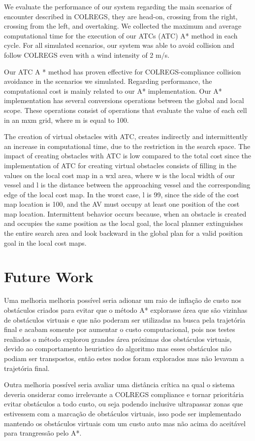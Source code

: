     We evaluate the performance of our system regarding the main scenarios of encounter described in \ac{COLREGS}, they are head-on, crossing from the right, crossing from the left, and overtaking. We collected the maximum and average computational time for the execution of our \aclp{ATC} (\ac{ATC}) A* method in each cycle. For all simulated scenarios, our system was able to avoid collision and follow \ac{COLREGS} even with a wind intensity of 2 m/s.

    Our \ac{ATC} A * method has proven effective for \ac{COLREGS}-compliance collision avoidance in the scenarios we simulated. Regarding performance, the computational cost is mainly related to our A* implementation. Our A* implementation has several conversions operations between the global and local scope. These operations consist of operations that evaluate the value of each cell in an mxm grid, where m is equal to 100.
    
    The creation of virtual obstacles with \ac{ATC}, creates indirectly and intermittently an increase in computational time, due to the restriction in the search space. The impact of creating obstacles with \ac{ATC} is low compared to the total cost since the implementation of \ac{ATC} for creating virtual obstacles consists of filling in the values on the local cost map in a wxl area, where w is the local width of our vessel and l  is the distance between the approaching vessel and the corresponding edge of the local cost map. In the worst case, l is 99, since the side of the cost map location is 100, and the \ac{AV} must occupy at least one position of the cost map location. Intermittent behavior occurs because, when an obstacle is created and occupies the same position as the local goal, the local planner extinguishes the entire search area and look backward in the global plan for a valid position goal in the local cost maps.
    
    \section{Future Work}
    
    Uma melhoria melhoria possível seria adionar um raio de inflação de custo nos obstáculos criados para evitar que o método A* explorasse área que são vizinhas de obstáculos virtuais e que não poderam ser utilizadas na busca pela trajetória final e acabam somente por aumentar o custo computacional, pois nos testes realiados o método explorou grandes área próximas dos obstáculos virtuais, devido ao comportamento heuristico  do algoritmo mas esses obstáculos não podiam ser transpostos, então estes nodos foram explorados mas não levavam a trajetória final.
    
    Outra melhoria possível seria avaliar uma distância crítica na qual o sistema deveria onsiderar como irrelevante a COLREGS compliance e tornar prioritária evitar obstáculos a todo custo, ou seja podendo inclusive ultrapassar zonas que estivessem com a marcação de obstáculos virtuais, isso pode ser implementado mantendo os obstáculos virtuais com um custo auto mas não acima do aceitável para trangressão pelo A*.